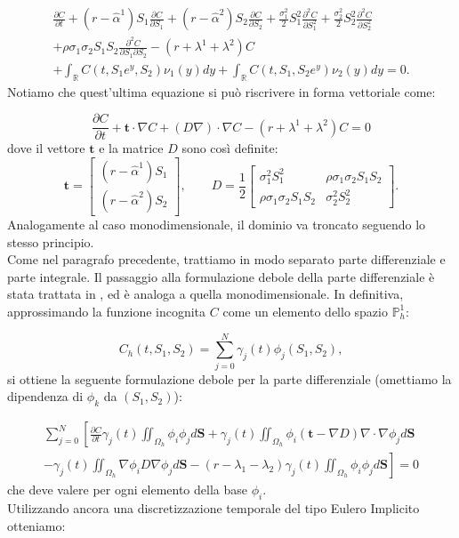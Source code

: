 \documentclass[a4paper,10pt]{report}
\newcommand{\der}[2]{\frac{\partial #1}{\partial #2}}
\newcommand{\dder}[2]{\frac{\partial^2 #1}{\partial #2^2}}
\newcommand{\dmix}[3]{\frac{\partial^2 #1}{\partial #2 \partial #3}}
\theoremstyle{plain}
\theoremstyle{definition}
\theoremstyle{remark}
\begin{document}
\begin{multline*}
 \der{C}{t}+(r-\hat{\alpha}^1)S_1\der{C}{S_1}+(r-\hat{\alpha}^2)S_2\der{C}{S_2}+\frac{\sigma^2_1}{2}S_1^2\dder{C}{S_1}+\frac{\sigma^2_2}{2}S_2^2\dder{C}{S_2}\\
 +\rho\sigma_1\sigma_2S_1S_2\dmix{C}{S_1}{S_2}-(r+\lambda^1+\lambda^2)C\\
 +\int_\mathbb{R}C(t,S_1e^y,S_2)\nu_1(y)dy+\int_\mathbb{R}C(t,S_1,S_2e^y)\nu_2(y)dy=0.
\end{multline*}
Notiamo che quest'ultima equazione si può riscrivere in forma vettoriale come:

\begin{equation}
 \der{C}{t}+\mathbf{t}\cdot\nabla C+(D\nabla)\cdot\nabla C -(r+\lambda^1+\lambda^2)C=0
\end{equation}
dove il vettore $\mathbf{t}$ e la matrice $D$ sono così definite:
\begin{equation*}
\mathbf{t}=
\begin{bmatrix}
 (r-\hat{\alpha}^1)S_1\\
 (r-\hat{\alpha}^2)S_2
\end{bmatrix},
\qquad
D=\frac{1}{2}
\begin{bmatrix}
 \sigma^2_1 S_1^2 & \rho\sigma_1\sigma_2S_1S_2 \\
 \rho\sigma_1\sigma_2S_1S_2 & \sigma^2_2 S_2^2
\end{bmatrix}.
\end{equation*}
Analogamente al caso monodimensionale, il dominio va troncato seguendo lo stesso principio.\\
Come nel paragrafo precedente, trattiamo in modo separato parte differenziale e parte integrale. Il passaggio alla formulazione debole della parte differenziale è stata trattata in \cite{tao2009finite}, ed è analoga a quella monodimensionale. In definitiva, approssimando la funzione incognita $C$ come un elemento dello spazio $\mathbb{P}_h^1$:

\begin{equation*}
C_h(t,S_1,S_2)=\sum_{j=0}^N\gamma_j(t)\phi_j(S_1,S_2),
\end{equation*}
si ottiene la seguente formulazione debole per la parte differenziale (omettiamo la dipendenza di $\phi_k$ da $(S_1,S_2)$):

\begin{multline*}
 \sum_{j=0}^N\left[\der{C}{t}\gamma_j(t)\iint_{\Omega_h}\phi_i\phi_j d\mathbf{S} +\gamma_j(t)\iint_{\Omega_h}\phi_i(\mathbf{t}-\nabla D)\nabla \cdot \nabla\phi_j d\mathbf{S}\right.\\
 \left.-\gamma_j(t)\iint_{\Omega_h}\nabla\phi_i D \nabla\phi_j d\mathbf{S}-(r-\lambda_1-\lambda_2)\gamma_j(t)\iint_{\Omega_h}\phi_i\phi_j d\mathbf{S} \right]=0
\end{multline*}
che deve valere per ogni elemento della base $\phi_i$.\\
Utilizzando ancora una discretizzazione temporale del tipo Eulero Implicito otteniamo:
\end{document}
